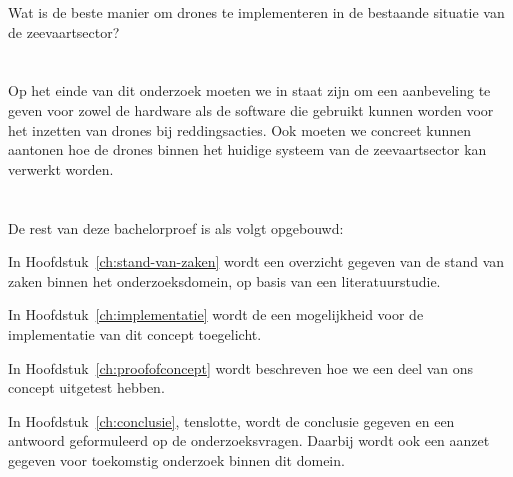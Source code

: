 Wat is de beste manier om drones te implementeren in de bestaande situatie van de zeevaartsector?

\section{}
\label{sec:onderzoeksdoelstelling}

Op het einde van dit onderzoek moeten we in staat zijn om een aanbeveling te geven voor zowel de hardware als de software die gebruikt kunnen worden voor het inzetten van drones bij reddingsacties. Ook moeten we concreet kunnen aantonen hoe de drones binnen het huidige systeem van de zeevaartsector kan verwerkt worden.

\section{}
\label{sec:opzet-bachelorproef}


De rest van deze bachelorproef is als volgt opgebouwd:

In Hoofdstuk~\ref{ch:stand-van-zaken} wordt een overzicht gegeven van de stand van zaken binnen het onderzoeksdomein, op basis van een literatuurstudie.

In Hoofdstuk~\ref{ch:implementatie} wordt de een mogelijkheid voor de implementatie van dit concept toegelicht.

In Hoofdstuk~\ref{ch:proofofconcept} wordt beschreven hoe we een deel van ons concept uitgetest hebben.


In Hoofdstuk~\ref{ch:conclusie}, tenslotte, wordt de conclusie gegeven en een antwoord geformuleerd op de onderzoeksvragen. Daarbij wordt ook een aanzet gegeven voor toekomstig onderzoek binnen dit domein.